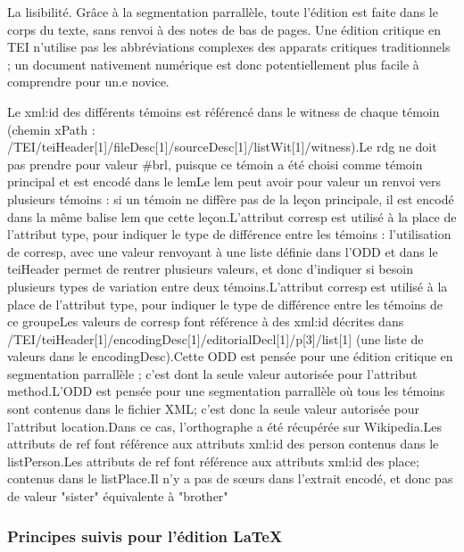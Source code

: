 \documentclass[12pt, a4paper]{article}
\begin{document}
                     
                     La lisibilité. Grâce à la segmentation parrallèle, toute l'édition est faite dans le corps du texte, sans renvoi à des notes de bas de pages. Une édition critique en TEI
                        n'utilise pas les abbréviations complexes des apparats critiques traditionnels ; un document nativement numérique est donc potentiellement plus facile à comprendre pour un.e novice.
                  
               Le xml:id des différents témoins est référencé dans le witness de chaque témoin
                              (chemin xPath : /TEI/teiHeader[1]/fileDesc[1]/sourceDesc[1]/listWit[1]/witness).Le rdg ne doit pas prendre pour valeur #brl, puisque ce témoin a été choisi comme témoin principal et est encodé dans le lemLe lem peut avoir pour valeur un renvoi vers plusieurs témoins : si un témoin ne diffère pas de la leçon principale, il est encodé dans la même balise lem que cette leçon.L'attribut corresp est utilisé à la place de l'attribut type, pour indiquer le type de différence entre les témoins :
                           l'utilisation de corresp, avec une valeur renvoyant à une liste définie dans l'ODD et dans le teiHeader permet de rentrer plusieurs valeurs,
                           et donc d'indiquer si besoin plusieurs types de variation entre deux témoins.L'attribut corresp est utilisé à la place de l'attribut type, pour indiquer le type de différence entre les témoins de ce groupeLes valeurs de corresp font référence à des xml:id décrites dans /TEI/teiHeader[1]/encodingDesc[1]/editorialDecl[1]/p[3]/list[1]
                              (une liste de valeurs dans le encodingDesc).Cette ODD est pensée pour une édition critique en segmentation parrallèle ; c'est dont la
                           seule valeur autorisée pour l'attribut method.L'ODD est pensée pour une segmentation parrallèle où tous les témoins sont contenus dans le fichier XML;
                           c'est donc la seule valeur autorisée pour l'attribut location.Dans ce cas, l'orthographe a été récupérée sur Wikipedia.Les attributs de ref font référence aux attributs xml:id des person contenus dans le listPerson.Les attributs de ref font référence aux attributs xml:id des place; contenus dans le listPlace.Il n'y a pas de sœurs dans l'extrait encodé, et donc pas de valeur "sister" équivalente à "brother"
                \subsubsection{Principes suivis pour l'édition \LaTeX}
                
\end{document}
